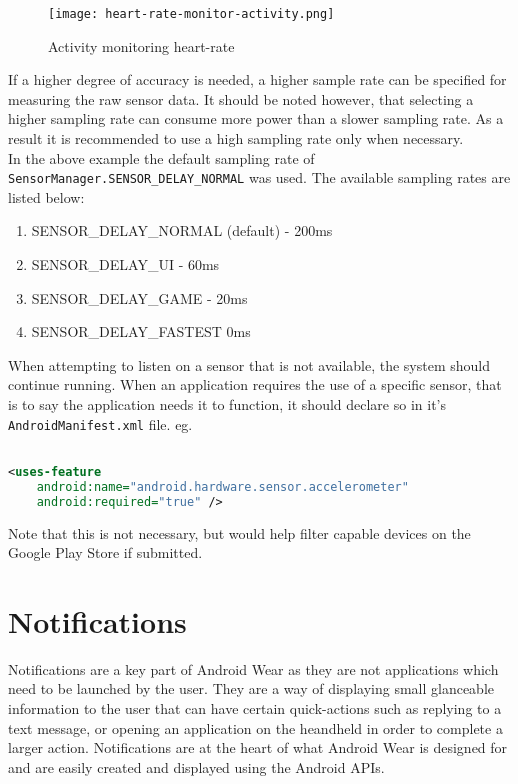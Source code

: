 \begin{figure}
    \centering
    \texttt{[image: heart-rate-monitor-activity.png]}
    \caption{Activity monitoring heart-rate}
    \label{fig:awesome_image}
\end{figure}

If a higher degree of accuracy is needed, a higher sample rate can be specified
for measuring the raw sensor data. It should be noted however, that selecting a
higher sampling rate can consume more power than a slower sampling rate. As a
result it is recommended to use a high sampling rate only when necessary.\\
In the above example the default sampling rate of
\texttt{SensorManager.SENSOR\_DELAY\_NORMAL} was used. The available sampling
rates are listed below:
\begin{enumerate}
\item SENSOR\_DELAY\_NORMAL (default) - 200ms
\item SENSOR\_DELAY\_UI - 60ms
\item SENSOR\_DELAY\_GAME - 20ms
\item SENSOR\_DELAY\_FASTEST 0ms
\end{enumerate}

When attempting to listen on a sensor that is not available, the system should
continue running. When an application requires the use of a specific sensor,
that is to say the application needs it to function, it should declare so in
it's \texttt{AndroidManifest.xml} file. eg.

\begin{lstlisting}[language=XML]

<uses-feature
    android:name="android.hardware.sensor.accelerometer"
    android:required="true" />

\end{lstlisting}

Note that this is not necessary, but would help filter capable devices on the 
Google Play Store if submitted.


\section{Notifications}

Notifications are a key part of Android Wear as they are not applications which
need to be launched by the user. They are a way of displaying small glanceable
information to the user that can have certain quick-actions such as replying
to a text message, or opening an application on the heandheld in order to
complete a larger action. Notifications are at the heart of what Android Wear
is designed for and are easily created and displayed using the Android APIs.

